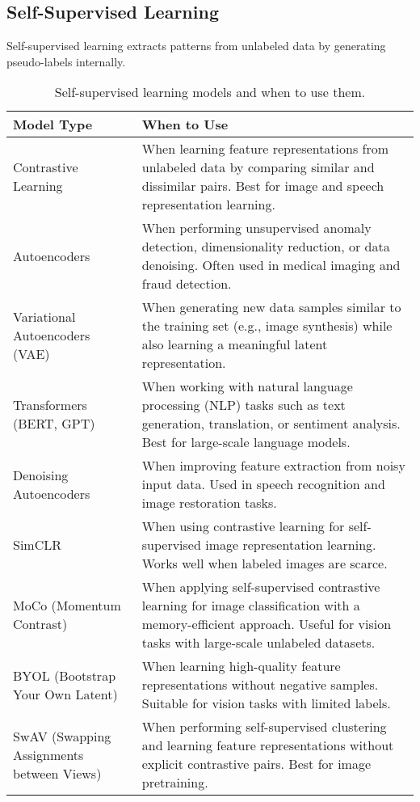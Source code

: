 \documentclass[12pt,openany]{book}
\begin{document}
\subsection{Self-Supervised Learning}

Self-supervised learning extracts patterns from unlabeled data by generating 
pseudo-labels internally.

\begin{table}[H]
    \centering
    \small
    \renewcommand{\arraystretch}{1.3} %
    \begin{tabular}{|l|p{8cm}|}
        \hline
        \textbf{Model Type} & \textbf{When to Use} \\
        \hline
        Contrastive Learning & When learning feature representations from unlabeled data by comparing similar and dissimilar pairs. Best for image and speech representation learning. \\
        \hline
        Autoencoders & When performing unsupervised anomaly detection, dimensionality reduction, or data denoising. Often used in medical imaging and fraud detection. \\
        \hline
        Variational Autoencoders (VAE) & When generating new data samples similar to the training set (e.g., image synthesis) while also learning a meaningful latent representation. \\
        \hline
        Transformers (BERT, GPT) & When working with natural language processing (NLP) tasks such as text generation, translation, or sentiment analysis. Best for large-scale language models. \\
        \hline
        Denoising Autoencoders & When improving feature extraction from noisy input data. Used in speech recognition and image restoration tasks. \\
        \hline
        SimCLR & When using contrastive learning for self-supervised image representation learning. Works well when labeled images are scarce. \\
        \hline
        MoCo (Momentum Contrast) & When applying self-supervised contrastive learning for image classification with a memory-efficient approach. Useful for vision tasks with large-scale unlabeled datasets. \\
        \hline
        BYOL (Bootstrap Your Own Latent) & When learning high-quality feature representations without negative samples. Suitable for vision tasks with limited labels. \\
        \hline
        SwAV (Swapping Assignments between Views) & When performing self-supervised clustering and learning feature representations without explicit contrastive pairs. Best for image pretraining. \\
        \hline
    \end{tabular}
    \caption{Self-supervised learning models and when to use them.}
\end{table}
\end{document}
